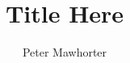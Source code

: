 
\title{Title Here}
\author{Peter Mawhorter}
\maketitle
\newpage

\thispagestyle{empty}
\newpage

\tableofcontents

\listoffigures

\listoftables

\newpage

